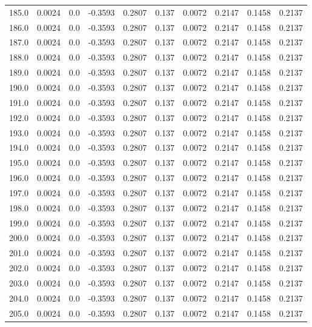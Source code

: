 \begin{longtable}{lrrrrrrrrr}
185.0 & 0.0024 & 0.0 & -0.3593 & 0.2807 & 0.137 & 0.0072 & 0.2147 & 0.1458 & 0.2137 \\
186.0 & 0.0024 & 0.0 & -0.3593 & 0.2807 & 0.137 & 0.0072 & 0.2147 & 0.1458 & 0.2137 \\
187.0 & 0.0024 & 0.0 & -0.3593 & 0.2807 & 0.137 & 0.0072 & 0.2147 & 0.1458 & 0.2137 \\
188.0 & 0.0024 & 0.0 & -0.3593 & 0.2807 & 0.137 & 0.0072 & 0.2147 & 0.1458 & 0.2137 \\
189.0 & 0.0024 & 0.0 & -0.3593 & 0.2807 & 0.137 & 0.0072 & 0.2147 & 0.1458 & 0.2137 \\
190.0 & 0.0024 & 0.0 & -0.3593 & 0.2807 & 0.137 & 0.0072 & 0.2147 & 0.1458 & 0.2137 \\
191.0 & 0.0024 & 0.0 & -0.3593 & 0.2807 & 0.137 & 0.0072 & 0.2147 & 0.1458 & 0.2137 \\
192.0 & 0.0024 & 0.0 & -0.3593 & 0.2807 & 0.137 & 0.0072 & 0.2147 & 0.1458 & 0.2137 \\
193.0 & 0.0024 & 0.0 & -0.3593 & 0.2807 & 0.137 & 0.0072 & 0.2147 & 0.1458 & 0.2137 \\
194.0 & 0.0024 & 0.0 & -0.3593 & 0.2807 & 0.137 & 0.0072 & 0.2147 & 0.1458 & 0.2137 \\
195.0 & 0.0024 & 0.0 & -0.3593 & 0.2807 & 0.137 & 0.0072 & 0.2147 & 0.1458 & 0.2137 \\
196.0 & 0.0024 & 0.0 & -0.3593 & 0.2807 & 0.137 & 0.0072 & 0.2147 & 0.1458 & 0.2137 \\
197.0 & 0.0024 & 0.0 & -0.3593 & 0.2807 & 0.137 & 0.0072 & 0.2147 & 0.1458 & 0.2137 \\
198.0 & 0.0024 & 0.0 & -0.3593 & 0.2807 & 0.137 & 0.0072 & 0.2147 & 0.1458 & 0.2137 \\
199.0 & 0.0024 & 0.0 & -0.3593 & 0.2807 & 0.137 & 0.0072 & 0.2147 & 0.1458 & 0.2137 \\
200.0 & 0.0024 & 0.0 & -0.3593 & 0.2807 & 0.137 & 0.0072 & 0.2147 & 0.1458 & 0.2137 \\
201.0 & 0.0024 & 0.0 & -0.3593 & 0.2807 & 0.137 & 0.0072 & 0.2147 & 0.1458 & 0.2137 \\
202.0 & 0.0024 & 0.0 & -0.3593 & 0.2807 & 0.137 & 0.0072 & 0.2147 & 0.1458 & 0.2137 \\
203.0 & 0.0024 & 0.0 & -0.3593 & 0.2807 & 0.137 & 0.0072 & 0.2147 & 0.1458 & 0.2137 \\
204.0 & 0.0024 & 0.0 & -0.3593 & 0.2807 & 0.137 & 0.0072 & 0.2147 & 0.1458 & 0.2137 \\
205.0 & 0.0024 & 0.0 & -0.3593 & 0.2807 & 0.137 & 0.0072 & 0.2147 & 0.1458 & 0.2137 \\

\end{longtable}
